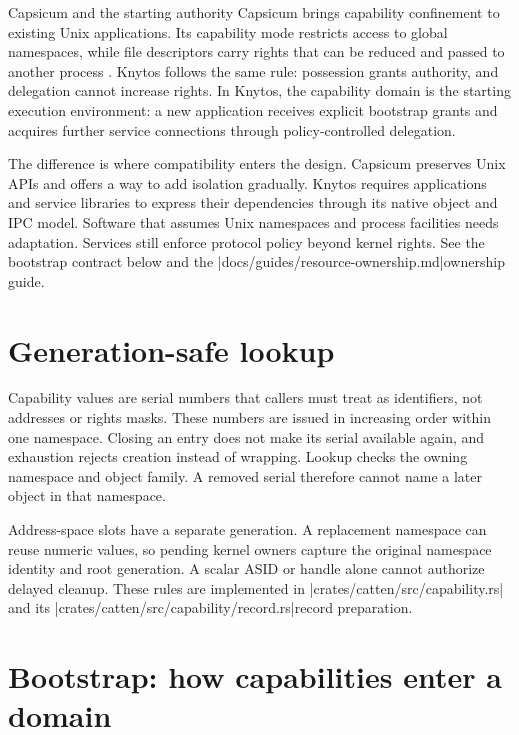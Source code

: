 \begin{architecturalcomparison}{Capsicum and the starting authority}
Capsicum brings capability confinement to existing Unix applications. Its
capability mode restricts access to global namespaces, while file descriptors
carry rights that can be reduced and passed to another process
\cite{prior:capsicum}. Knytos follows the same rule: possession grants
authority, and delegation cannot increase rights. In Knytos, the capability
domain is the starting execution environment: a new
application receives explicit bootstrap grants and acquires further service
connections through policy-controlled delegation.

The difference is where compatibility enters the design. Capsicum preserves
Unix APIs and offers a way to add isolation gradually. Knytos
requires applications and service libraries to express their dependencies
through its native object and IPC model. Software that assumes Unix namespaces
and process facilities needs adaptation. Services still enforce protocol
policy beyond kernel rights. See the bootstrap contract below and the
\repofiletext|docs/guides/resource-ownership.md|{ownership guide}.
\end{architecturalcomparison}

\section{Generation-safe lookup}

Capability values are serial numbers that callers must treat as identifiers,
not addresses or rights masks. These numbers are issued in increasing order
within one namespace.
Closing an entry does not make its serial available again, and exhaustion rejects
creation instead of wrapping. Lookup checks the owning namespace and object
family. A removed serial therefore cannot name a later object in that namespace.

Address-space slots have a separate generation. A replacement namespace can reuse
numeric values, so pending kernel owners capture the original namespace identity
and root generation. A scalar ASID or handle alone cannot authorize delayed
cleanup. These rules are implemented in \repofile|crates/catten/src/capability.rs|
and its \repofiletext|crates/catten/src/capability/record.rs|{record preparation}.

\section{Bootstrap: how capabilities enter a domain}

